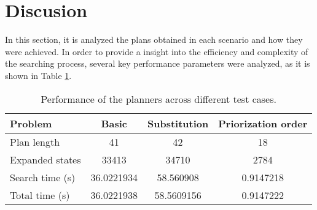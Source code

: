 \section{Discusion}
In this section, it is analyzed the plans obtained in each scenario and how they were achieved. In order to provide a insight into the 
efficiency and complexity of the searching process, several key performance parameters were analyzed, as it is shown in Table \ref{tab:tabla}. 

\begin{table}[H]
    \centering
    \begin{tabular}{|l|c|c|c|}
    \hline
    Problem         & Basic & Substitution & Priorization order \\ \hline
    Plan length     &  41     &    42          &        18            \\ \hline
    Expanded states &    33413   &     34710         &  2784                  \\ \hline
    Search time (s)    & 36.0221934      &    58.560908       &    0.9147218           \\ \hline
    Total time (s)     &   36.0221938     &     58.5609156           & 0.9147222 \\ \hline
    \end{tabular}\label{tab:tabla}
    \caption{Performance of the planners across different test cases.}
\end{table}